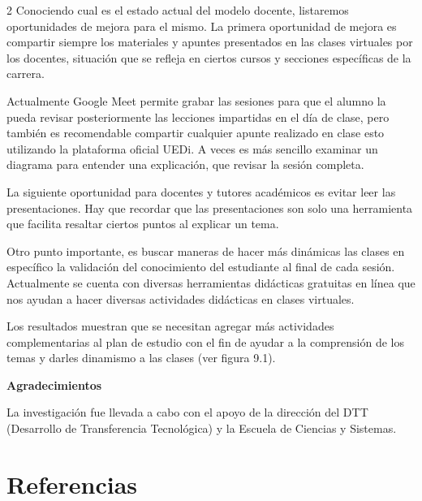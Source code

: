 \documentclass[12pt,spanish,Letterpaper,openany]{book}
\begin{document}
\begin {multicols}{2}
Conociendo cual es el estado actual del modelo docente, listaremos oportunidades de mejora para el mismo. La primera oportunidad de mejora es compartir siempre los materiales y apuntes presentados en las clases virtuales por los docentes, situación que se refleja en ciertos cursos y secciones específicas de la carrera.

Actualmente Google Meet permite grabar las sesiones para que el alumno la pueda revisar posteriormente las lecciones impartidas en el día de clase, pero también es recomendable compartir cualquier apunte realizado en clase esto utilizando la plataforma oficial UEDi. A veces es más sencillo examinar un diagrama para entender una explicación, que revisar la sesión completa.

La siguiente oportunidad para docentes y tutores académicos es evitar leer las presentaciones. Hay que recordar que las presentaciones son solo una herramienta que facilita resaltar ciertos puntos al explicar un tema.

Otro punto importante, es buscar maneras de hacer más dinámicas las clases en específico la validación del conocimiento del estudiante al final de cada sesión. Actualmente se cuenta con diversas herramientas didácticas gratuitas en línea que nos ayudan a hacer diversas actividades didácticas en clases virtuales.

Los resultados muestran que se necesitan agregar más actividades complementarias al plan de estudio con el fin de ayudar a la comprensión de los temas y darles dinamismo a las clases (ver figura 9.1).

\textbf{Agradecimientos}

La investigación fue llevada a cabo con el apoyo de la dirección del DTT (Desarrollo de Transferencia Tecnológica) y la Escuela de Ciencias y Sistemas.

\hypertarget{referencias-8}{%
\section*{Referencias}\label{referencias-8}}


\end{multicols}
\end{document}
